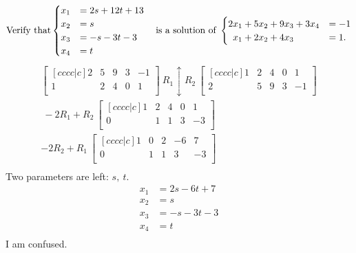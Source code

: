 \documentclass[basic]{inVerba-notes}
\begin{document}
\begin{enumerate}
{\[\text{Verify that} \begin{cases}
x_1 & = 2s + 12t +13 \\
x_2 & = s \\
x_3 & = -s - 3t - 3 \\
x_4 & = t
\end{cases} \quad \text{is a solution of }
\begin{cases}
2x_1 + 5x_2 + 9x_3 + 3x_4 &= -1 \\
\hphantom{2}x_1 + 2x_2 + 4x_3  &= 1.
\end{cases}
\]}
\begin{align*}
  \begin{bmatrix}[cccc|c]
    2 & 5 & 9 & 3 & -1 \\
    1 & 2 & 4 & 0 & 1 \\
  \end{bmatrix}
  ~R_1\updownarrow R_2~
  \begin{bmatrix}[cccc|c]
    1 & 2 & 4 & 0 & 1 \\
    2 & 5 & 9 & 3 & -1 \\
  \end{bmatrix}\\ 
  ~-2R_1 + R_2~
  \begin{bmatrix}[cccc|c]
    1 & 2 & 4 & 0 & 1 \\
    0 & 1 & 1 & 3 & -3 \\
  \end{bmatrix}\\
  -2R_2 + R_1~
  \begin{bmatrix}[cccc|c]
    1 & 0 & 2 & -6 & 7 \\
    0 & 1 & 1 & 3 & -3 \\
  \end{bmatrix}\\
\end{align*}
Two parameters are left: \(s,~t\). 
\begin{align*}
  x_1 &= 2s - 6t + 7 \\
  x_2 &= s \\
  x_3 &= -s - 3t - 3 \\
  x_4 &= t \\
\end{align*}
I am confused.


\end{enumerate}
\end{document}
